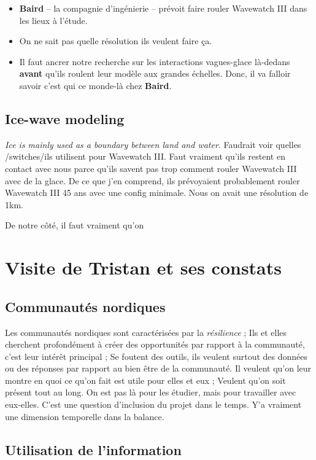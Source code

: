 \documentclass[10pt]{article}
\numberwithin{equation}{section}
\begin{document}
\begin{itemize}
\item \textbf{Baird} -- la compagnie d'ingénierie -- prévoit faire rouler Wavewatch III dans les lieux à l'étude.
\item On ne sait pas quelle résolution ils veulent faire ça.
\item Il faut ancrer notre recherche sur les interactions vagues-glace là-dedans \textbf{avant} qu'ils roulent leur modèle aux grandes échelles. Donc, il va falloir savoir c'est qui ce monde-là chez \textbf{Baird}.
\end{itemize}
\subsection{Ice-wave modeling}
\label{sec:org6a44e90}
\emph{Ice is mainly used as a boundary between land and water}. Faudrait voir quelles /switches/ils utilisent pour Wavewatch III. Faut vraiment qu'ils restent en contact avec nous parce qu'ils savent pas trop comment rouler Wavewatch III avec de la glace. De ce que j'en comprend, ils prévoyaient probablement rouler Wavewatch III 45 ans avec une config minimale. Nous on avait une résolution de 1km.

De notre côté, il faut vraiment qu'on
\section{Visite de Tristan et ses constats}
\label{sec:org343f474}

\subsection{Communautés nordiques}
\label{sec:org8e1d561}

Les communautés nordiques sont caractérisées par la \emph{résilience} ;
Ils et elles cherchent profondément à créer des opportunités par rapport à la communauté, c'est leur intérêt principal ;
Se foutent des outils, ils veulent surtout des données ou des réponses par rapport au bien être de la communauté. Il veulent qu'on leur montre en quoi ce qu'on fait est utile pour elles et eux ;
Veulent qu'on soit présent tout au long. On est pas là pour les étudier, mais pour travailler avec eux-elles. C'est une question d'inclusion du projet dans le temps. Y'a vraiment une dimension temporelle dans la balance.
\subsection{Utilisation de l'information}
\label{sec:org1576aae}
\end{document}
